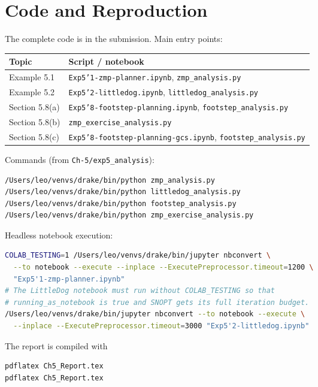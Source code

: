 \documentclass[11pt]{article}
\begin{document}
\section{Code and Reproduction}\label{sec:repro}

The complete code is in the submission.  Main entry points:
\begin{center}
\small
\begin{tabular}{ll}
\toprule
Topic & Script / notebook \\
\midrule
Example 5.1 & \texttt{Exp5'1-zmp-planner.ipynb}, \texttt{zmp\_analysis.py} \\
Example 5.2 & \texttt{Exp5'2-littledog.ipynb}, \texttt{littledog\_analysis.py} \\
Section 5.8(a) & \texttt{Exp5'8-footstep-planning.ipynb},
\texttt{footstep\_analysis.py} \\
Section 5.8(b) & \texttt{zmp\_exercise\_analysis.py} \\
Section 5.8(c) & \texttt{Exp5'8-footstep-planning-gcs.ipynb},
\texttt{footstep\_analysis.py} \\
\bottomrule
\end{tabular}
\end{center}

Commands (from \texttt{Ch-5/exp5\_analysis}):
\begin{lstlisting}[language=bash]
/Users/leo/venvs/drake/bin/python zmp_analysis.py
/Users/leo/venvs/drake/bin/python littledog_analysis.py
/Users/leo/venvs/drake/bin/python footstep_analysis.py
/Users/leo/venvs/drake/bin/python zmp_exercise_analysis.py
\end{lstlisting}

Headless notebook execution:
\begin{lstlisting}[language=bash]
COLAB_TESTING=1 /Users/leo/venvs/drake/bin/jupyter nbconvert \
  --to notebook --execute --inplace --ExecutePreprocessor.timeout=1200 \
  "Exp5'1-zmp-planner.ipynb"
# The LittleDog notebook must run without COLAB_TESTING so that
# running_as_notebook is true and SNOPT gets its full iteration budget.
/Users/leo/venvs/drake/bin/jupyter nbconvert --to notebook --execute \
  --inplace --ExecutePreprocessor.timeout=3000 "Exp5'2-littledog.ipynb"
\end{lstlisting}

The report is compiled with
\begin{lstlisting}[language=bash]
pdflatex Ch5_Report.tex
pdflatex Ch5_Report.tex
\end{lstlisting}
\end{document}
